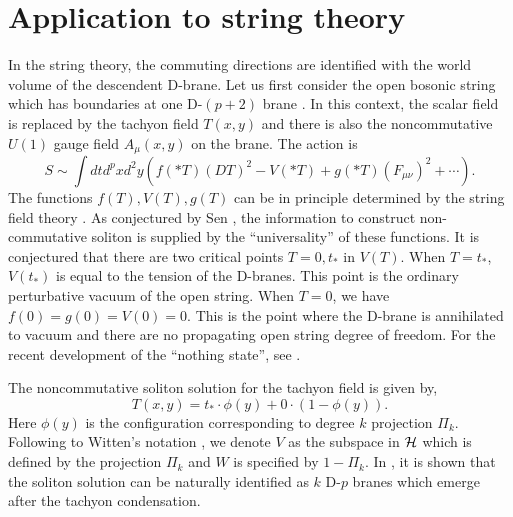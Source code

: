 \documentclass[a4paper,12pt]{article}
\begin{document}
\section{Application to string theory}
In the string theory, the commuting
directions are identified with the world volume
of the descendent D-brane.
Let us first consider the open bosonic string 
which has boundaries at one D-$(p+2)$ brane \cite{r:Chicago}.
In this context, the scalar field is replaced by
the tachyon field $T(x,y)$ and there is also 
the noncommutative $U(1)$ gauge field
$A_\mu(x,y)$ on the brane. The action is
\begin{equation}
 S\sim \int dt d^{p} x d^2 y\left(
f(* T) (D T)^2 -V(* T) + g(* T)(F_{\mu\nu})^2
+\cdots\right).
\end{equation}
%
%
The functions $f(T), V(T), g(T)$ can be in principle
determined by the string field theory \cite{r:SFT}.
As conjectured by Sen \cite{r:Sen}, the information
to construct non-commutative soliton is supplied by the
``universality'' of these functions.  It is conjectured
that there are two critical points $T=0, t_*$ in $V(T)$.
When $T=t_*$, $V(t_*)$ is equal to the tension of the
D-branes.  This point is the ordinary perturbative
vacuum of the open string.
When $T=0$, we have $f(0)=g(0)=V(0)=0$.
This is the point where the D-brane is annihilated to vacuum 
and there are no propagating open string degree of freedom.
For the recent development of the ``nothing state'', see \cite{r:nothing}.

The noncommutative soliton solution for the tachyon field 
is given by,
\begin{equation}
 T(x,y) = t_* \cdot \phi(y) + 0\cdot (1-\phi(y)).
\end{equation}
Here $\phi(y)$ is the configuration corresponding to
degree $k$ projection $\Pi_k$.  
Following to Witten's notation \cite{r:Witten},
we denote $V$ as the subspace in ${\cal H}$ which is defined by the
projection $\Pi_k$ and $W$ is specified by $1-\Pi_k$.  
In \cite{r:Chicago}, it is shown that
the soliton solution can be naturally identified as $k$
D-$p$ branes which emerge after the tachyon condensation.
\end{document}
